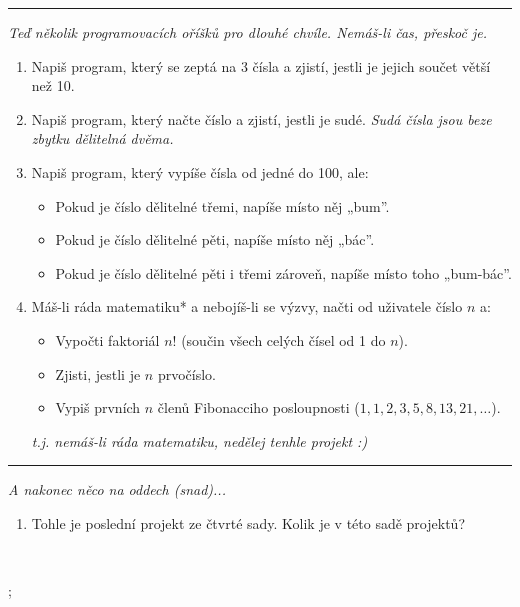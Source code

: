 \documentclass[a4paper,10pt]{article}
\newcommand\startsection[1]{
     \vspace{0.2ex}
    \hrule
    {\fontspec{Oxygen} \tiny
     \vspace{-1ex}
     \emph{#1}
     \vspace{-1.5em}
    }
}
\begin{document}
\startsection{Teď několik programovacích oříšků pro dlouhé chvíle. Nemáš-li čas, přeskoč je.}

\begin{enumerate}[resume]

\item Napiš program, který se zeptá na 3 čísla
    a zjistí, jestli je jejich součet větší než 10.

\item Napiš program, který načte číslo a zjistí, jestli je sudé.
    \emph{\small Sudá čísla jsou beze \emph{zbytku} dělitelná dvěma.}

\item Napiš program, který vypíše čísla od jedné do 100, ale:
    \begin{itemize}
        \item Pokud je číslo dělitelné třemi, napíše místo něj „bum”.
        \item Pokud je číslo dělitelné pěti, napíše místo něj „bác”.
        \item Pokud je číslo dělitelné pěti i třemi zároveň, napíše místo toho „bum-bác”.
    \end{itemize}

\item Máš-li ráda matematiku* a nebojíš-li se výzvy, načti od uživatele číslo $n$ a:
    \begin{itemize}
        \item Vypočti faktoriál $n!$ (součin všech celých čísel od 1 do $n$).
        \item Zjisti, jestli je $n$ prvočíslo.
        \item Vypiš prvních $n$ členů Fibonacciho posloupnosti ($1, 1, 2, 3, 5, 8, 13, 21, \ldots $).
    \end{itemize}
    \emph{\small * t.j. nemáš-li ráda matematiku, nedělej tenhle projekt :)}

\end{enumerate}

\startsection{A nakonec něco na oddech (snad)...}

\begin{enumerate}[resume]
\item Tohle je poslední projekt ze čtvrté sady. Kolik je v této sadě projektů?

\end{enumerate}

\vfill
\hfill~%
\begin{tikz}
;
\end{tikz}
\end{document}
